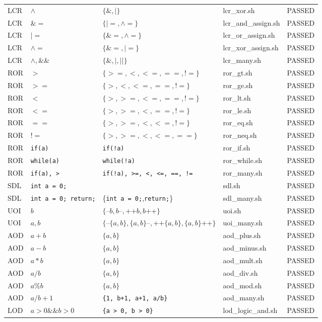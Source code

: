 \begin{longtable}{|p{1cm}|p{3cm}|p{5.5cm}|p{2.5cm}|p{1.5cm}|}
LCR	&	$\land$	&	$\{\&,|\}$	&	lcr\_xor.sh  & PASSED\\
LCR	&	$\&=$	&	$\{|=, \land=\}$	&	lcr\_and\_assign.sh  & PASSED\\
LCR	&	$|=$	&	$\{\&=, \land=\}$	&	lcr\_or\_assign.sh  & PASSED\\
LCR	&	$\land=$	&	$\{\&=, |=\}$	&	lcr\_xor\_assign.sh  & PASSED\\
LCR	&	$\land, \&\&$	&	$\{\&,|,||\}$	&	lcr\_many.sh  & PASSED\\
ROR	&	$>$	&	$\{>=, <, <=, ==, !=\}$	&	ror\_gt.sh  & PASSED\\
ROR	&	$>=$	&	$\{>, <, <=, ==, !=\}$	&	ror\_ge.sh  & PASSED\\
ROR	&	$<$	&	$\{>, >=, <=, ==, !=\}$	&	ror\_lt.sh  & PASSED\\
ROR	&	$<=$	&	$\{>, >=, <, ==, !=\}$	&	ror\_le.sh  & PASSED\\
ROR	&	$==$	&	$\{>, >=, <, <=, !=\}$	&	ror\_eq.sh  & PASSED\\
ROR	&	$!=$	&	$\{>, >=, <, <=, ==\}$	&	ror\_neq.sh  & PASSED\\
ROR	&	\texttt{if(a)}	&	\texttt{if(!a)}	&	ror\_if.sh  & PASSED\\
ROR	&	\texttt{while(a)}	&	\texttt{while(!a)}	&	ror\_while.sh  & PASSED\\
ROR	&	\texttt{if(a), >}	&	\texttt{if(!a), >=, <, <=, ==, !=}	&	ror\_many.sh  & PASSED\\
SDL	&	\texttt{int a = 0;} &	\texttt{}	&	sdl.sh  & PASSED\\
SDL	&	\texttt{int a = 0; return;} &	\{\texttt{int a = 0;},\texttt{return;}\}	&	sdl\_many.sh  & PASSED\\
UOI	&	$b$	&	$\{\texttt{--}b, b\texttt{--}, \texttt{++}b, b\texttt{++}\}$	&	uoi.sh  & PASSED\\
UOI	&	$a,b$	&	$\{\texttt{--}\{a,b\}, \{a,b\}\texttt{--}, \texttt{++}\{a,b\}, \{a,b\}\texttt{++}\}$	&	uoi\_many.sh  & PASSED\\
AOD	&	$a + b$	&	$\{a, b\}$	&	aod\_plus.sh  & PASSED\\
AOD	&	$a - b$	&	$\{a, b\}$	&	aod\_minus.sh  & PASSED\\
AOD	&	$a * b$	&	$\{a, b\}$	&	aod\_mult.sh  & PASSED\\
AOD	&	$a / b$	&	$\{a, b\}$	&	aod\_div.sh  & PASSED\\
AOD	&	$a \% b$	&	$\{a, b\}$	&	aod\_mod.sh  & PASSED\\
AOD	&	$a / b + 1$	&	\texttt{\{1, b+1, a+1, a/b\}}	&	aod\_many.sh  & PASSED\\
LOD	&	$a > 0 \&\& b > 0$	&	\texttt{\{a > 0, b > 0\}}	&	lod\_logic\_and.sh  & PASSED\\

\end{longtable}
